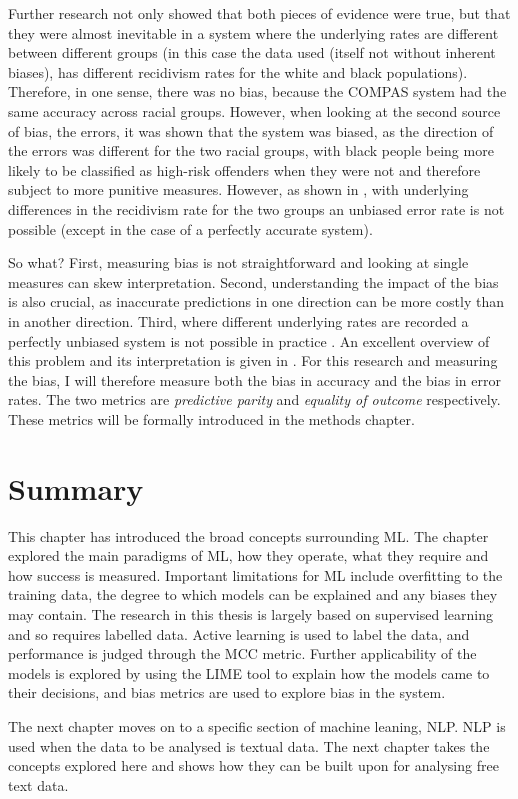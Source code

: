 Further research  \parencite{kleinberg2016inherent, chouldechova2017fair} not only showed that both pieces of evidence were true, but that they were almost inevitable in a system where the underlying rates are different between different groups (in this case the data used (itself not without inherent biases), has different recidivism rates for the white and black populations).  Therefore, in one sense, there was no bias, because the COMPAS system had the same accuracy across racial groups. However, when looking at the second source of bias, the errors, it was shown that the system was biased, as the direction of the errors was different for the two racial groups, with black people being more likely to be classified as high-risk offenders when they were not and therefore subject to more punitive measures. However, as shown in \textcite{kleinberg2016inherent}, with underlying differences in the recidivism rate for the two groups an unbiased error rate is not possible (except in the case of a perfectly accurate system). 

So what? First, measuring bias is not straightforward and looking at single measures can skew interpretation. Second, understanding the impact of the bias is also crucial, as inaccurate predictions in one direction can be more costly than in another direction. Third, where different underlying rates are recorded a perfectly unbiased system is not possible in practice \parencite{kleinberg2016inherent}. An excellent overview of this problem and its interpretation is given in \parencite{hellman2020measuring}. For this research and measuring the bias, I will therefore measure both the bias in accuracy and the bias in error rates. The two metrics are \emph{predictive parity} and \emph{equality of outcome} respectively. These metrics will be formally introduced in the methods chapter.  



\section{Summary}

This chapter has introduced the broad concepts surrounding ML. The chapter explored the main paradigms of ML, how they operate, what they require and how success is measured. Important limitations for ML include overfitting to the training data, the degree to which models can be explained and any biases they may contain. The research in this thesis is largely based on supervised learning and so requires labelled data. Active learning is used to label the data, and performance is judged through the MCC metric. Further applicability of the models is explored by using the LIME tool to explain how the models came to their decisions, and bias metrics are used to explore bias in the system.

The next chapter moves on to a specific section of machine leaning, NLP. NLP is used when the data to be analysed is textual data. The next chapter takes the concepts explored here and shows how they can be built upon for analysing free text data.
